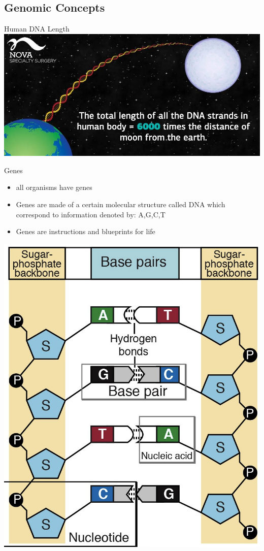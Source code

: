\documentclass{beamer}
\begin{document}
\subsection{Genomic Concepts}

\begin{frame}{Human DNA Length}
    \centering
    \includegraphics[scale=0.3]{dna-length.jpg}
\end{frame}

\begin{frame}{Genes}
  \begin{itemize}   
    \item all organisms have genes
    \item Genes are made of a certain molecular structure called DNA which correspond to information denoted by: A,G,C,T
    \item Genes are instructions and blueprints for life
  \end{itemize}
\centering
\includegraphics[scale=0.1]{gene-base-pair.png}
\end{frame}
\end{document}
